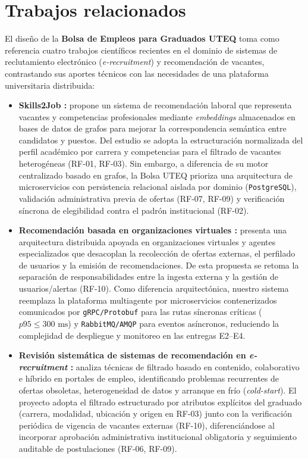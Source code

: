 \documentclass[11pt,a4paper]{article}
\begin{document}
\section{Trabajos relacionados}

El diseño de la \textbf{Bolsa de Empleos para Graduados UTEQ} toma como referencia cuatro trabajos científicos recientes en el dominio de sistemas de reclutamiento electrónico (\textit{e-recruitment}) y recomendación de vacantes, contrastando sus aportes técnicos con las necesidades de una plataforma universitaria distribuida:

\begin{itemize}
    \item \textbf{Skills2Job \cite{giabelli2021}:} propone un sistema de recomendación laboral que representa vacantes y competencias profesionales mediante \textit{embeddings} almacenados en bases de datos de grafos para mejorar la correspondencia semántica entre candidatos y puestos. Del estudio se adopta la estructuración normalizada del perfil académico por carrera y competencias para el filtrado de vacantes heterogéneas (RF-01, RF-03). Sin embargo, a diferencia de su motor centralizado basado en grafos, la Bolsa UTEQ prioriza una arquitectura de microservicios con persistencia relacional aislada por dominio (\texttt{PostgreSQL}), validación administrativa previa de ofertas (RF-07, RF-09) y verificación síncrona de elegibilidad contra el padrón institucional (RF-02).
    \item \textbf{Recomendación basada en organizaciones virtuales \cite{gonzalezbriones2024}:} presenta una arquitectura distribuida apoyada en organizaciones virtuales y agentes especializados que desacoplan la recolección de ofertas externas, el perfilado de usuarios y la emisión de recomendaciones. De esta propuesta se retoma la separación de responsabilidades entre la ingesta externa y la gestión de usuarios/alertas (RF-10). Como diferencia arquitectónica, nuestro sistema reemplaza la plataforma multiagente por microservicios contenerizados comunicados por \texttt{gRPC/Protobuf} para las rutas síncronas críticas ($p95 \le 300\text{ ms}$) y \texttt{RabbitMQ/AMQP} para eventos asíncronos, reduciendo la complejidad de despliegue y monitoreo en las entregas E2--E4.
    \item \textbf{Revisión sistemática de sistemas de recomendación en \textit{e-recruitment} \cite{freire2021}:} analiza técnicas de filtrado basado en contenido, colaborativo e híbrido en portales de empleo, identificando problemas recurrentes de ofertas obsoletas, heterogeneidad de datos y arranque en frío (\textit{cold-start}). El proyecto adopta el filtrado estructurado por atributos explícitos del graduado (carrera, modalidad, ubicación y origen en RF-03) junto con la verificación periódica de vigencia de vacantes externas (RF-10), diferenciándose al incorporar aprobación administrativa institucional obligatoria y seguimiento auditable de postulaciones (RF-06, RF-09).

\end{itemize}
\end{document}
